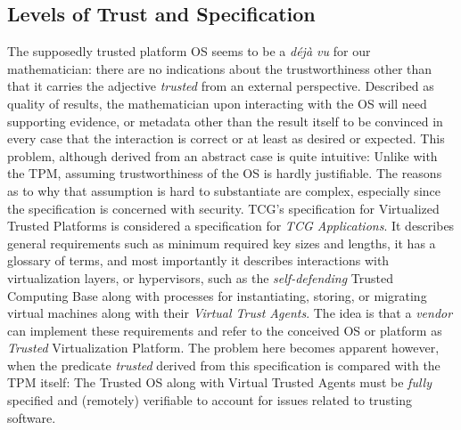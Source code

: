 \subsection{Levels of Trust and Specification}
The supposedly trusted platform OS seems to be a \emph{déjà vu} for our mathematician\cite{Dijkstra1979}: there are no indications about the trustworthiness other than that it carries the adjective \emph{trusted} from an external perspective. Described as quality of results, the mathematician upon interacting with the OS will need supporting evidence, or metadata other than the result itself to be convinced in every case that the interaction is correct or at least as desired or expected. This problem, although derived from an abstract case is quite intuitive: Unlike with the TPM, assuming trustworthiness of the OS is hardly justifiable. The reasons as to why that assumption is hard to substantiate are complex, especially since the specification is concerned with security. TCG's specification for Virtualized Trusted Platforms is considered a specification for \emph{TCG Applications}. It describes general requirements such as minimum required key sizes and lengths, it has a glossary of terms, and most importantly it describes interactions with virtualization layers, or hypervisors, such as the \emph{self-defending} Trusted Computing Base along with processes for instantiating, storing, or migrating virtual machines along with their \emph{Virtual Trust Agents}. The idea is that a \emph{vendor} can implement these requirements and refer to the conceived OS or platform as \emph{Trusted} Virtualization Platform. The problem here becomes apparent however, when the predicate \emph{trusted} derived from this specification is compared with the TPM itself: The Trusted OS along with Virtual Trusted Agents must be \emph{fully} specified and (remotely) verifiable\cite{sel4} to account for issues related to trusting software\cite{Lampson,Thompson}.


